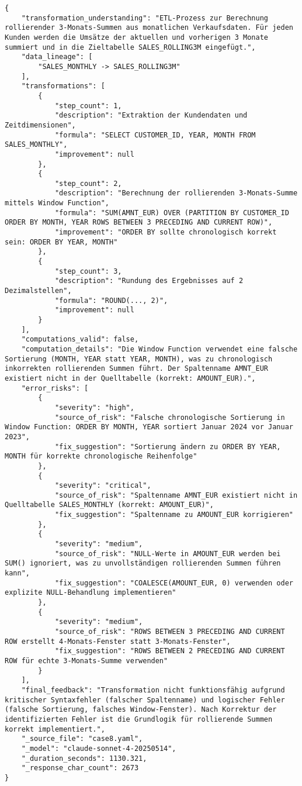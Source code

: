 \begin{lstlisting}[caption={Ausgabe: Claude Sonnet 4 Anwendungsfall 8 Hauptdurchlauf},label={claude_case8_prompt1}]
{
    "transformation_understanding": "ETL-Prozess zur Berechnung rollierender 3-Monats-Summen aus monatlichen Verkaufsdaten. Für jeden Kunden werden die Umsätze der aktuellen und vorherigen 3 Monate summiert und in die Zieltabelle SALES_ROLLING3M eingefügt.",
    "data_lineage": [
        "SALES_MONTHLY -> SALES_ROLLING3M"
    ],
    "transformations": [
        {
            "step_count": 1,
            "description": "Extraktion der Kundendaten und Zeitdimensionen",
            "formula": "SELECT CUSTOMER_ID, YEAR, MONTH FROM SALES_MONTHLY",
            "improvement": null
        },
        {
            "step_count": 2,
            "description": "Berechnung der rollierenden 3-Monats-Summe mittels Window Function",
            "formula": "SUM(AMNT_EUR) OVER (PARTITION BY CUSTOMER_ID ORDER BY MONTH, YEAR ROWS BETWEEN 3 PRECEDING AND CURRENT ROW)",
            "improvement": "ORDER BY sollte chronologisch korrekt sein: ORDER BY YEAR, MONTH"
        },
        {
            "step_count": 3,
            "description": "Rundung des Ergebnisses auf 2 Dezimalstellen",
            "formula": "ROUND(..., 2)",
            "improvement": null
        }
    ],
    "computations_valid": false,
    "computation_details": "Die Window Function verwendet eine falsche Sortierung (MONTH, YEAR statt YEAR, MONTH), was zu chronologisch inkorrekten rollierenden Summen führt. Der Spaltenname AMNT_EUR existiert nicht in der Quelltabelle (korrekt: AMOUNT_EUR).",
    "error_risks": [
        {
            "severity": "high",
            "source_of_risk": "Falsche chronologische Sortierung in Window Function: ORDER BY MONTH, YEAR sortiert Januar 2024 vor Januar 2023",
            "fix_suggestion": "Sortierung ändern zu ORDER BY YEAR, MONTH für korrekte chronologische Reihenfolge"
        },
        {
            "severity": "critical",
            "source_of_risk": "Spaltenname AMNT_EUR existiert nicht in Quelltabelle SALES_MONTHLY (korrekt: AMOUNT_EUR)",
            "fix_suggestion": "Spaltenname zu AMOUNT_EUR korrigieren"
        },
        {
            "severity": "medium",
            "source_of_risk": "NULL-Werte in AMOUNT_EUR werden bei SUM() ignoriert, was zu unvollständigen rollierenden Summen führen kann",
            "fix_suggestion": "COALESCE(AMOUNT_EUR, 0) verwenden oder explizite NULL-Behandlung implementieren"
        },
        {
            "severity": "medium",
            "source_of_risk": "ROWS BETWEEN 3 PRECEDING AND CURRENT ROW erstellt 4-Monats-Fenster statt 3-Monats-Fenster",
            "fix_suggestion": "ROWS BETWEEN 2 PRECEDING AND CURRENT ROW für echte 3-Monats-Summe verwenden"
        }
    ],
    "final_feedback": "Transformation nicht funktionsfähig aufgrund kritischer Syntaxfehler (falscher Spaltenname) und logischer Fehler (falsche Sortierung, falsches Window-Fenster). Nach Korrektur der identifizierten Fehler ist die Grundlogik für rollierende Summen korrekt implementiert.",
    "_source_file": "case8.yaml",
    "_model": "claude-sonnet-4-20250514",
    "_duration_seconds": 1130.321,
    "_response_char_count": 2673
}
\end{lstlisting}


